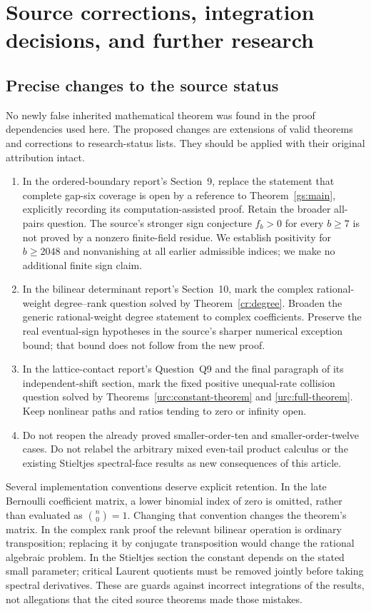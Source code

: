 \documentclass[11pt,a4paper]{article}
\theoremstyle{definition}
\theoremstyle{remark}
\numberwithin{equation}{section}
\begin{document}
\section{Source corrections, integration decisions, and further research}
\label{audit:section}

\subsection{Precise changes to the source status}

No newly false inherited mathematical theorem was found in the
proof dependencies used here. The proposed changes are extensions
of valid theorems and corrections to research-status lists.
They should be applied with their original attribution intact.

\begin{enumerate}
\item In the ordered-boundary report's Section~9, replace the
statement that complete gap-six coverage is open by a reference
to Theorem~\ref{gs:main}, explicitly recording its
computation-assisted proof. Retain the broader all-pairs question.
The source's stronger sign conjecture
$f_b>0$ for every $b\ge7$ is not proved by a nonzero finite-field
residue. We establish positivity for $b\ge2048$ and nonvanishing
at all earlier admissible indices; we make no additional finite
sign claim.
\item In the bilinear determinant report's Section~10, mark the
complex rational-weight degree--rank question solved by
Theorem~\ref{cr:degree}. Broaden the generic rational-weight
degree statement to complex coefficients. Preserve the real
eventual-sign hypotheses in the source's sharper numerical
exception bound; that bound does not follow from the new proof.
\item In the lattice-contact report's Question~Q9 and the final
paragraph of its independent-shift section, mark the fixed
positive unequal-rate collision question solved by
Theorems~\ref{urc:constant-theorem} and \ref{urc:full-theorem}.
Keep nonlinear paths and ratios tending to zero or infinity open.
\item Do not reopen the already proved smaller-order-ten and
smaller-order-twelve cases. Do not relabel the arbitrary mixed
even-tail product calculus or the existing Stieltjes spectral-face
results as new consequences of this article.
\end{enumerate}

Several implementation conventions deserve explicit retention.
In the late Bernoulli coefficient matrix, a lower binomial index
of zero is omitted, rather than evaluated as $\binom n0=1$.
Changing that convention changes the theorem's matrix. In the
complex rank proof the relevant bilinear operation is ordinary
transposition; replacing it by conjugate transposition would
change the rational algebraic problem. In the Stieltjes section
the constant depends on the stated small parameter; critical
Laurent quotients must be removed jointly before taking spectral
derivatives. These are guards against incorrect integrations of
the results, not allegations that the cited source theorems made
those mistakes.
\end{document}
